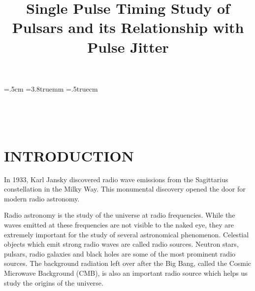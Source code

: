 \documentclass{article_saj}
\begin{document}
%
\parindent=.5cm
\baselineskip=3.8truemm
\columnsep=.5truecm
%
\newenvironment{lefteqnarray}{\arraycolsep=0pt\begin{eqnarray}}
{\end{eqnarray}\protect\aftergroup\ignorespaces}
\newenvironment{lefteqnarray*}{\arraycolsep=0pt\begin{eqnarray*}}
{\end{eqnarray*}\protect\aftergroup\ignorespaces}
\newenvironment{leftsubeqnarray}{\arraycolsep=0pt\begin{subeqnarray}}
{\end{subeqnarray}\protect\aftergroup\ignorespaces}
%


\begin{strip}

{\ }

\vskip-5cm

{\ }


\title{Single Pulse Timing Study of Pulsars and its Relationship with Pulse Jitter}



\vskip3mm


\address{BTech in Mathematics and Computing, Indian Institute of Science, Bengaluru}



\noindent {}

\end{strip}

\tenrm


\section{INTRODUCTION}

\indent

In 1933, Karl Jansky discovered radio wave emissions from the Sagittarius constellation in the Milky Way. This monumental discovery opened the door for modern radio astronomy. 

Radio astronomy is the study of the universe at radio frequencies. While the waves emitted at these frequencies are not visible to the naked eye, they are extremely important for the study of several astronomical phenomenon. Celestial objects which emit strong radio waves are called radio sources. Neutron stars, pulsars, radio galaxies and black holes are some of the most prominent radio sources. The background radiation left over after the Big Bang, called the Cosmic Microwave Background (CMB), is also an important radio source which helps us study the origins of the universe.
\end{document}
